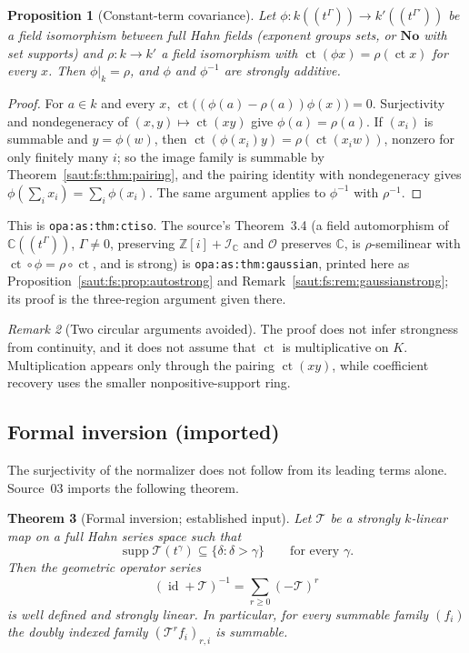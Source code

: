 \documentclass[11pt]{article}
\newtheorem{theorem}{Theorem}[section]
\newtheorem{proposition}[theorem]{Proposition}
\theoremstyle{definition}
\theoremstyle{remark}
\newtheorem{remark}[theorem]{Remark}
\newcommand{\No}{\mathbf{No}}
\newcommand{\C}{\mathbb C}
\newcommand{\Z}{\mathbb Z}
\newcommand{\OO}{\mathcal O}
\newcommand{\id}{\operatorname{id}}
\newcommand{\supp}{\operatorname{supp}}
\newcommand{\lbl}[1]{\nolinkurl{#1}}%
\newcommand{\ct}{\operatorname{ct}}
\newcommand{\Ineg}{\mathcal I}
\numberwithin{equation}{section}
\begin{document}
\begin{proposition}[Constant-term covariance]\label{saut:gr:prop:ctcov}
Let $\phi:k((t^\Gamma))\to k'((t^{\Gamma'}))$ be a field isomorphism between full Hahn
fields (exponent groups sets, or $\No$ with set supports) and $\rho:k\to k'$ a field
isomorphism with $\ct(\phi x)=\rho(\ct x)$ for every $x$. Then $\phi|_k=\rho$, and
$\phi$ and $\phi^{-1}$ are strongly additive.
\end{proposition}
\begin{proof}
For $a\in k$ and every $x$, $\ct\bigl((\phi(a)-\rho(a))\phi(x)\bigr)=0$. Surjectivity
and nondegeneracy of $(x,y)\mapsto\ct(xy)$ give $\phi(a)=\rho(a)$. If $(x_i)$ is
summable and $y=\phi(w)$, then $\ct(\phi(x_i)y)=\rho(\ct(x_iw))$, nonzero for only
finitely many $i$; so the image family is summable by
Theorem~\ref{saut:fs:thm:pairing}, and the pairing identity with nondegeneracy gives
$\phi(\sum_ix_i)=\sum_i\phi(x_i)$. The same argument applies to $\phi^{-1}$ with
$\rho^{-1}$.
\end{proof}

This is \lbl{opa:as:thm:ctiso}. The source's Theorem~3.4 (a field automorphism of
$\C((t^\Gamma))$, $\Gamma\ne0$, preserving $\Z[i]+\Ineg_\C$ and $\OO$ preserves $\C$, is
$\rho$-semilinear with $\ct\circ\phi=\rho\circ\ct$, and is strong) is
\lbl{opa:as:thm:gaussian}, printed here as Proposition~\ref{saut:fs:prop:autostrong}
and Remark~\ref{saut:fs:rem:gaussianstrong}; its proof is the three-region argument
given there.

\begin{remark}[Two circular arguments avoided]\label{saut:gr:rem:circular}
The proof does not infer strongness from continuity, and it does not assume that
$\ct$ is multiplicative on $K$. Multiplication appears only through the pairing
$\ct(xy)$, while coefficient recovery uses the smaller nonpositive-support ring.
\end{remark}

\subsection{Formal inversion (imported)}

The surjectivity of the normalizer does not follow from its leading terms alone.
Source~03 imports the following theorem.

\begin{theorem}[Formal inversion; established input]\label{saut:gr:thm:inverse}
Let $\mathcal T$ be a strongly $k$-linear map on a full Hahn series space such that
\[
 \supp\mathcal T(t^\gamma)\subseteq\{\delta:\delta>\gamma\}\qquad\text{for every }\gamma.
\]
Then the geometric operator series
\begin{equation}\label{saut:gr:eq:geoinv}
 (\id+\mathcal T)^{-1}=\sum_{r\ge0}(-\mathcal T)^r
\end{equation}
is well defined and strongly linear. In particular, for every summable family
$(f_i)$ the doubly indexed family $(\mathcal T^rf_i)_{r,i}$ is summable.
\end{theorem}
\end{document}
